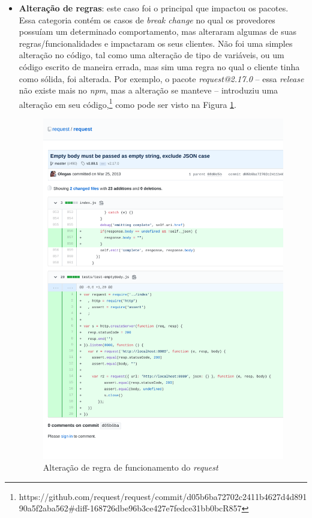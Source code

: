 \begin{itemize}
    \item \textbf{Alteração de regras}: este caso foi o principal que impactou os pacotes. Essa categoria contém os casos de \textit{break change} no qual os provedores possuíam um determinado comportamento, mas alteraram algumas de suas regras/funcionalidades e impactaram os seus clientes. Não foi uma simples alteração no código, tal como uma alteração de tipo de variáveis, ou um código escrito de maneira errada, mas sim uma regra no qual o cliente tinha como sólida, foi alterada. Por exemplo, o pacote \textit{request@2.17.0} -- essa \textit{release} não existe mais no \textit{npm}, mas a alteração se manteve -- introduziu uma alteração em seu código,\footnote{https://github.com/request/request/commit/d05b6ba72702c2411b4627d4d89190a5f2aba562\#diff-168726dbe96b3ce427e7fedce31bb0bcR857} como pode ser visto na Figura \ref{fig:bc_category_change_rule_1}.

    \begin{figure}
        \centering
        \includegraphics{figuras/bc_category_change_rule_1.pdf}
        \caption{Alteração de regra de funcionamento do \textit{request}}
        \label{fig:bc_category_change_rule_1}
    \end{figure}{}


\end{itemize}

